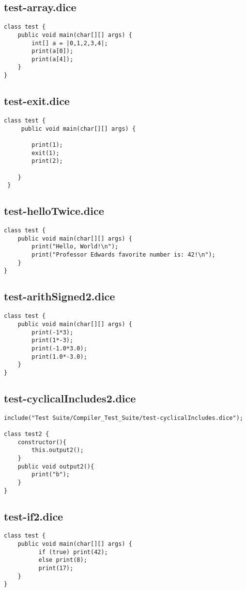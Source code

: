 \subsection{test-array.dice}
\begin{verbatim}
class test {
	public void main(char[][] args) {
		int[] a = |0,1,2,3,4|;
		print(a[0]);
		print(a[4]);
	}
}

\end{verbatim}
\pagebreak
\subsection{test-exit.dice}
\begin{verbatim}
class test {
	 public void main(char[][] args) {
		
		print(1);
		exit(1);
		print(2);

 	}
 }
\end{verbatim}
\pagebreak
\subsection{test-helloTwice.dice}
\begin{verbatim}
class test {
	public void main(char[][] args) {
		print("Hello, World!\n");
		print("Professor Edwards favorite number is: 42!\n");
	}
}
\end{verbatim}
\pagebreak
\subsection{test-arithSigned2.dice}
\begin{verbatim}
class test {
	public void main(char[][] args) {
		print(-1*3);
		print(1*-3);
		print(-1.0*3.0);
		print(1.0*-3.0);
	}
}
\end{verbatim}
\pagebreak
\subsection{test-cyclicalIncludes2.dice}
\begin{verbatim}
include("Test Suite/Compiler_Test_Suite/test-cyclicalIncludes.dice");

class test2 {
	constructor(){
		this.output2();
	}
	public void output2(){
		print("b");
	}
}

\end{verbatim}
\pagebreak
\subsection{test-if2.dice}
\begin{verbatim}
class test {
	public void main(char[][] args) {
		  if (true) print(42); 
		  else print(8);
  		  print(17);
  	}
}

\end{verbatim}
\pagebreak

